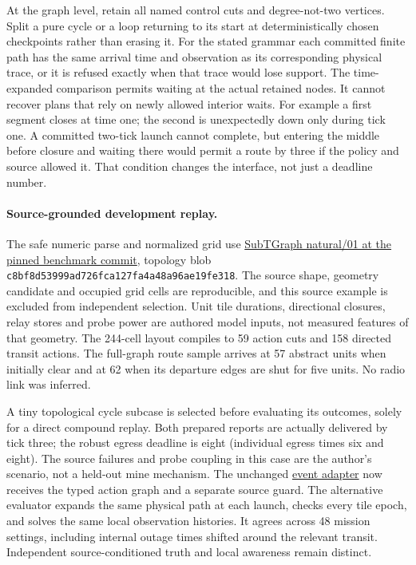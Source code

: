 \documentclass[11pt]{article}
\begin{document}
At the graph level, retain all named control cuts and degree-not-two
vertices. Split a pure cycle or a loop returning to its start at
deterministically chosen checkpoints rather than erasing it. For the
stated grammar each committed finite path has the same arrival time and
observation as its corresponding physical trace, or it is refused
exactly when that trace would lose support. The time-expanded comparison
permits waiting at the actual retained nodes. It cannot recover plans
that rely on newly allowed interior waits. For example a first segment
closes at time one; the second is unexpectedly down only during tick one.
A committed two-tick launch cannot complete, but entering the middle
before closure and waiting there would permit a route by three if the
policy and source allowed it. That condition changes the interface, not
just a deadline number.

\paragraph{Source-grounded development replay.}
The safe numeric parse and normalized grid use
\href{https://github.com/LTU-RAI/SubTGraph/tree/21a1bcabf37c8f2f6f236ba40b916094d9903b5b/benchmark}{SubTGraph natural/01 at the pinned benchmark commit},
topology blob \texttt{c8bf8d53999ad726fca127fa4a48a96ae19fe318}.
The source shape, geometry candidate and occupied grid cells are
reproducible, and this source example is excluded from independent
selection. Unit tile durations, directional closures, relay stores and
probe power are authored model inputs, not measured features of that
geometry. The 244-cell layout compiles to 59 action cuts and 158
directed transit actions. The full-graph route sample arrives at 57
abstract units when initially clear and at 62 when its departure
edges are shut for five units. No radio link was inferred.

A tiny topological cycle subcase is selected before evaluating its
outcomes, solely for a direct compound replay. Both prepared reports
are actually delivered by tick three; the robust egress deadline is
eight (individual egress times six and eight). The source failures and
probe coupling in this case are the author's scenario, not a held-out
mine mechanism. The unchanged \href{https://github.com/eternal-november/eos-research-programmes/pull/377}{event adapter} now receives the typed action graph and a
separate source guard. The alternative evaluator expands the same
physical path at each launch, checks every tile epoch, and solves the
same local observation histories. It agrees across 48 mission settings,
including internal outage times shifted around the relevant transit.
Independent source-conditioned truth and local awareness remain distinct.
\end{document}
